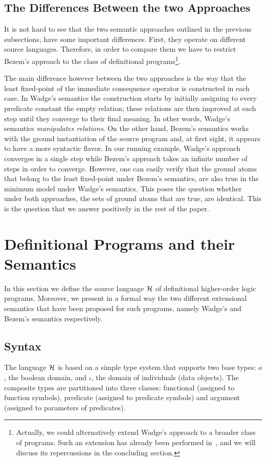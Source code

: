 \documentclass[submission,copyright]{eptcs}
\theoremstyle{definition}
\begin{document}
\subsection{The Differences Between the two Approaches}
It is not hard to see that the two semantic approaches outlined in the previous
subsections, have some important differences. First, they operate on different
source languages. Therefore, in order to compare them we have to restrict Bezem's
approach to the class of definitional programs\footnote{Actually, we could alternatively
extend Wadge's approach to a broader class of programs. Such an extension has already
been performed in~\cite{CharalambidisHRW13}, and we will discuss its repercussions in the
concluding section.}.

The main difference however between the two approaches is the way that the least
fixed-point of the immediate consequence operator is constructed in each case.
In Wadge's semantics the construction starts by initially assigning to every predicate
constant the empty relation; these relations are then improved at each step until
they converge to their final meaning. In other words, Wadge's semantics {\em manipulates
relations}. On the other hand, Bezem's semantics works with the ground instantiation
of the source program and, at first sight, it appears to have a more syntactic flavor.
In our running example, Wadge's approach converges in a single step while Bezem's
approach takes an infinite number of steps in order to converge. However, one can easily verify that
the ground atoms that belong to the least fixed-point under Bezem's semantics, are also
true in the minimum model under Wadge's semantics. This poses the question whether
under both approaches, the sets of ground atoms that are true, are identical.
This is the question that we answer positively in the rest of the paper.

\section{Definitional Programs and their Semantics}
\label{sec:lang}
\label{section3}
In this section we define the source language ${\cal H}$ of definitional
higher-order logic programs. Moreover, we present in a formal way the two
different extensional semantics that have been proposed for such programs,
namely Wadge's and Bezem's semantics respectively.

\subsection{Syntax}
The language ${\cal H}$ is based on a simple
type system that supports two base types: $o$, the boolean domain,
and $\iota$, the domain of individuals (data objects). The composite
types are partitioned into three classes: functional (assigned to
function symbols), predicate (assigned to predicate symbols) and
argument (assigned to parameters of predicates).
\end{document}
